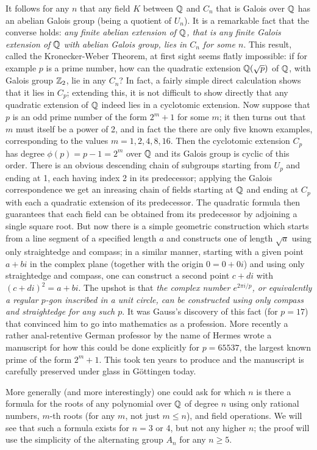 \documentclass[10pt]{article}
\begin{document}
It follows for any $n$ that any field $K$ between $\Bbb Q$ and $C_n$
that is Galois over $\Bbb Q$ has an abelian Galois group (being a
quotient of $U_n$). It is a remarkable fact that the converse holds:
{\sl any finite abelian extension of $\Bbb Q$, that is any finite Galois
  extension of $\Bbb Q$ with abelian Galois group, lies in $C_n$ for
  some $n$}. This result, called the Kronecker-Weber Theorem, at first
sight seems flatly impossible: if for example $p$ is a prime number, how
can the quadratic extension $\Bbb Q(\sqrt{p})$ of $\Bbb Q$, with Galois
group $\Bbb Z_2$, lie in any $C_n$? In fact, a fairly simple direct
calculation shows that it lies in $C_p$; extending this, it is not
difficult to show directly that any quadratic extension of $\Bbb Q$
indeed lies in a cyclotomic extension. Now suppose that $p$ is an odd
prime number of the form $2^m + 1$ for some $m$; it then turns out that
$m$ must itself be a power of 2, and in fact the there are only five
known examples, corresponding to the values $m=1,2,4,8,16$. Then the
cyclotomic extension $C_p$ has degree $\phi(p) = p-1 = 2^m$ over $\Bbb
Q$ and its Galois group is cyclic of this order. There is an obvious
descending chain of subgroups starting from $U_p$ and ending at 1, each
having index 2 in its predecessor; applying the Galois correspondence we
get an inreasing chain of fields starting at $\Bbb Q$ and ending at
$C_p$ with each a quadratic extension of its predecessor. The quadratic
formula then guarantees that each field can be obtained from its
predecessor by adjoining a single square root. But now there is a simple
geometric construction which starts from a line segment of a specified
length $a$ and constructs one of length $\sqrt{a}$ using only
straightedge and compass; in a similar manner, starting with a given
point $a+bi$ in the complex plane (together with the origin $0 = 0 +
0i$) and using only straightedge and compass, one can construct a second
point $c+di$ with $(c+di)^2 = a+bi$. The upshot is that {\sl the complex
  number $e^{2\pi i/p}$, or equivalently a regular $p$-gon inscribed in
  a unit circle, can be constructed using only compass and straightedge
  for any such $p$}. It was Gauss's discovery of this fact (for $p=17$)
that convinced him to go into mathematics as a profession. More recently
a rather anal-retentive German professor by the name of Hermes wrote a
manuscript for how this could be done explicitly for $p = 65537$, the
largest known prime of the form $2^m + 1$. This took ten years to
produce and the manuscript is carefully preserved under glass in
G\"ottingen today.

More generally (and more interestingly) one could ask for which $n$ is
there a formula for the roots of any polynomial over $\Bbb Q$ of degree
$n$ using only rational numbers, $m$-th roots (for any $m$, not just
$m\le n$), and field operations. We will see that such a formula exists
for $n=3$ or 4, but not any higher $n$; the proof will use the
simplicity of the alternating group $A_n$ for any $n\ge5$.
\end{document}

